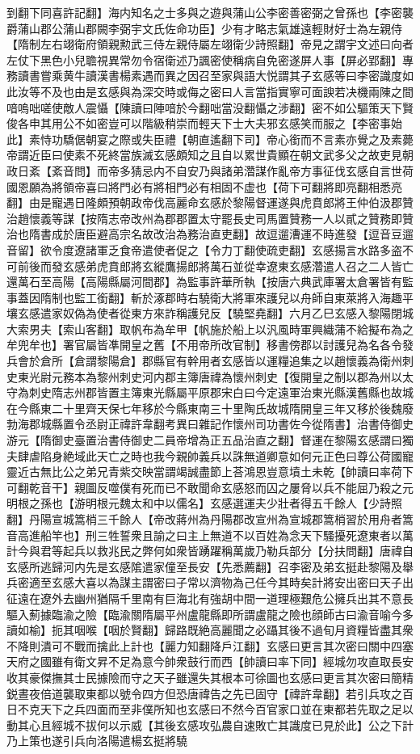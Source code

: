 到翻下同喜許記翻】海内知名之士多與之遊與蒲山公李密善密弼之曾孫也【李密襲爵蒲山郡公蒲山郡闕李弼宇文氏佐命功臣】少有才略志氣雄遠輕財好士為左親侍【隋制左右翊衛府領親勲武三侍左親侍屬左翊衛少詩照翻】帝見之謂宇文述曰向者左仗下黑色小兒聸視異常勿令宿衛述乃諷密使稱病自免密遂屏人事【屏必郢翻】專務讀書嘗乘黄牛讀漢書楊素遇而異之因召至家與語大悦謂其子玄感等曰李密識度如此汝等不及也由是玄感與為深交時或侮之密曰人言當指實寧可面諛若决機兩陳之間喑嗚咄嗟使敵人震懾【陳讀曰陣喑於今翻咄當没翻懾之涉翻】密不如公驅策天下賢俊各申其用公不如密豈可以階級稍崇而輕天下士大夫邪玄感笑而服之【李密事始此】素恃功驕倨朝宴之際或失臣禮【朝直遙翻下司】帝心銜而不言素亦覺之及素薨帝謂近臣曰使素不死終當族滅玄感頗知之且自以累世貴顯在朝文武多父之故吏見朝政日紊【紊音問】而帝多猜忌内不自安乃與諸弟濳謀作亂帝方事征伐玄感自言世荷國恩願為將領帝喜曰將門必有將相門必有相固不虚也【荷下可翻將即亮翻相悉亮翻】由是寵遇日隆頗預朝政帝伐高麗命玄感於黎陽督運遂與虎賁郎將王仲伯汲郡贊治趙懷義等謀【按隋志帝改州為郡郡置太守罷長史司馬置贊務一人以貳之贊務即贊治也隋書成於唐臣避高宗名故改治為務治直吏翻】故逗遛漕運不時進發【逗音豆遛音留】欲令度遼諸軍乏食帝遣使者促之【令力丁翻使疏吏翻】玄感揚言水路多盗不可前後而發玄感弟虎賁郎將玄縱鷹揚郎將萬石並從幸遼東玄感濳遣人召之二人皆亡還萬石至高陽【高陽縣屬河間郡】為監事許華所執【按唐六典武庫署太倉署皆有監事蓋因隋制也監工銜翻】斬於涿郡時右驍衛大將軍來護兒以舟師自東萊將入海趣平壤玄感遣家奴偽為使者從東方來詐稱護兒反【驍堅堯翻】六月乙巳玄感入黎陽閉城大索男夫【索山客翻】取帆布為牟甲【帆施於船上以汎風時軍興織蒲不給擬布為之牟兜牟也】署官屬皆凖開皇之舊【不用帝所改官制】移書傍郡以討護兒為名各令發兵會於倉所【倉謂黎陽倉】郡縣官有幹用者玄感皆以運糧追集之以趙懷義為衛州刺史東光尉元務本為黎州刺史河内郡主簿唐禕為懷州刺史【復開皇之制以郡為州以太守為刺史隋志州郡皆置主簿東光縣屬平原郡宋白曰今定遠軍治東光縣漢舊縣也故城在今縣東二十里齊天保七年移於今縣東南三十里陶氏故城隋開皇三年又移於後魏廢勃海郡城縣置令丞尉正禕許韋翻考異曰雜記作懷州司功書佐今從隋書】治書侍御史游元【隋御史臺置治書侍御史二員帝增為正五品治直之翻】督運在黎陽玄感謂曰獨夫肆虐陷身絶域此天亡之時也我今親帥義兵以誅無道卿意如何元正色曰尊公荷國寵靈近古無比公之弟兄青紫交映當謂竭誠盡節上荅鴻恩豈意墳土未乾【帥讀曰率荷下可翻乾音干】親圖反噬僕有死而已不敢聞命玄感怒而囚之屢脅以兵不能屈乃殺之元明根之孫也【游明根元魏太和中以儒名】玄感選運夫少壯者得五千餘人【少詩照翻】丹陽宣城篙梢三千餘人【帝改蔣州為丹陽郡改宣州為宣城郡篙梢習於用舟者篙音高進船竿也】刑三牲誓衆且諭之曰主上無道不以百姓為念天下騷擾死遼東者以萬計今與君等起兵以救兆民之弊何如衆皆踴躍稱萬歲乃勒兵部分【分扶問翻】唐禕自玄感所逃歸河内先是玄感隂遣家僮至長安【先悉薦翻】召李密及弟玄挺赴黎陽及舉兵密適至玄感大喜以為謀主謂密曰子常以濟物為己任今其時矣計將安出密曰天子出征遠在遼外去幽州猶隔千里南有巨海北有強胡中間一道理極艱危公擁兵出其不意長驅入薊據臨渝之險【臨渝關隋屬平州盧龍縣即所謂盧龍之險也顔師古曰渝音喻今多讀如榆】扼其咽喉【咽於賢翻】歸路既絶高麗聞之必躡其後不過旬月資糧皆盡其衆不降則潰可不戰而擒此上計也【麗力知翻降戶江翻】玄感曰更言其次密曰關中四塞天府之國雖有衛文昇不足為意今帥衆鼓行而西【帥讀曰率下同】經城勿攻直取長安收其豪傑撫其士民據險而守之天子雖還失其根本可徐圖也玄感曰更言其次密曰簡精鋭晝夜倍道襲取東都以號令四方但恐唐禕告之先已固守【禕許韋翻】若引兵攻之百日不克天下之兵四面而至非僕所知也玄感曰不然今百官家口並在東都若先取之足以動其心且經城不拔何以示威【其後玄感攻弘農自速敗亡其識度已見於此】公之下計乃上策也遂引兵向洛陽遣楊玄挺將驍